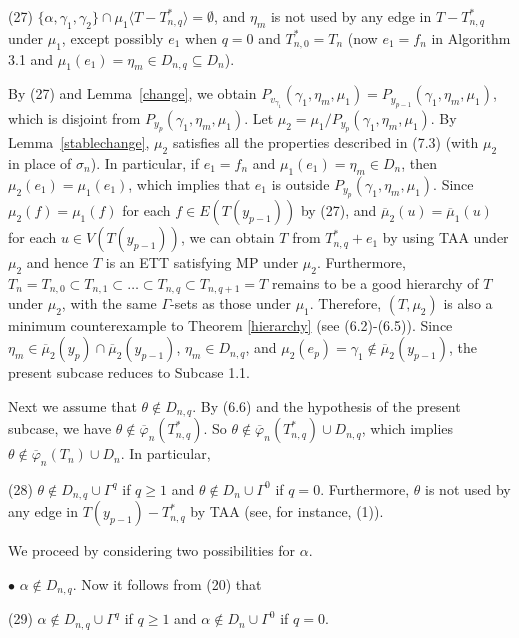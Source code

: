 \documentclass[11pt]{article}
\begin{document}
(27) $\{\alpha, \gamma_1, \gamma_2\}\cap \mu_1 \langle T - T_{n,q}^* \rangle=\emptyset$, and $\eta_m$ is not used by 
any edge in $T -  T_{n,q}^*$ under $\mu_1$, except possibly $e_1$ when $q=0$ and $T_{n,0}^*=T_n$ (now $e_1=f_n$ in 
Algorithm 3.1 and $\mu_1(e_1)=\eta_m \in D_{n,q} \subseteq D_n$). 

By (27) and  Lemma~\ref{change}, we obtain $P_{v_{\gamma_1}} (\gamma_1, \eta_m, \mu_1) = P_{y_{p-1}}(\gamma_1,\eta_m,  
\mu_1)$, which is disjoint from $P_{y_p}(\gamma_1,\eta_m, \mu_1)$. Let $\mu_2=\mu_1/P_{y_p}(\gamma_1,\eta_m, \mu_1)$.
By Lemma~\ref{stablechange},  $\mu_2$ satisfies all the properties described in (7.3) (with $\mu_2$ in 
place of $\sigma_n$). In particular, if $e_1=f_n$ and $\mu_1(e_1)=\eta_m \in D_n$, then $\mu_2(e_1)=\mu_1(e_1)$, which 
implies that $e_1$ is outside $P_{y_p}(\gamma_1,\eta_m, \mu_1)$.
Since $\mu_2(f)=\mu_1(f)$ for each $f\in E(T(y_{p-1}))$ by (27), and $\overline{\mu}_2(u)= 
\overline{\mu}_1(u)$ for each $u\in V(T(y_{p-1}))$, we can obtain $T$ from $T_{n,q}^*+e_1$ by using TAA under 
$\mu_2$ and hence $T$ is an ETT satisfying MP under $\mu_2$. Furthermore, $T_n=T_{n,0} \subset T_{n,1} \subset \ldots \subset 
T_{n,q} \subset T_{n,q+1}=T$ remains to be a good hierarchy of $T$ under $\mu_2$, with the same $\Gamma$-sets as those under $\mu_1$. Therefore, $(T, \mu_2)$ is also a minimum counterexample to Theorem \ref{hierarchy} (see (6.2)-(6.5)). Since $\eta_m \in \overline{\mu}_2(y_p) \cap \overline{\mu}_2(y_{p-1})$, $\eta_m\in D_{n,q}$,  and $\mu_2(e_p)=\gamma_1 \notin \overline{\mu}_2(y_{p-1})$, the present subcase reduces to Subcase 1.1.

Next we assume that $\theta \notin D_{n,q}$. By (6.6) and the hypothesis of the present subcase, we have $\theta \notin \overline{\varphi}_n(T_{n,q}^*)$. So $\theta \notin \overline{\varphi}_n(T_{n,q}^*) \cup D_{n,q}$, which implies
$\theta \notin \overline{\varphi}_n(T_n) \cup D_n$. In particular,

(28) $\theta \notin D_{n,q}\cup \Gamma^q$ if $q\ge 1$ and $\theta \notin D_n \cup \Gamma^0$ if $q=0$. Furthermore,
$\theta$ is not used by any edge in $T(y_{p-1}) -  T_{n,q}^*$ by TAA (see, for instance, (1)).

We proceed by considering two possibilities for $\alpha$.

$\bullet$ $\alpha\notin D_{n,q}$. Now it follows from (20) that  

(29) $\alpha \notin D_{n,q}\cup \Gamma^q$ if $q\ge 1$ and $\alpha \notin D_n \cup \Gamma^0$ if $q=0$.
\end{document}
